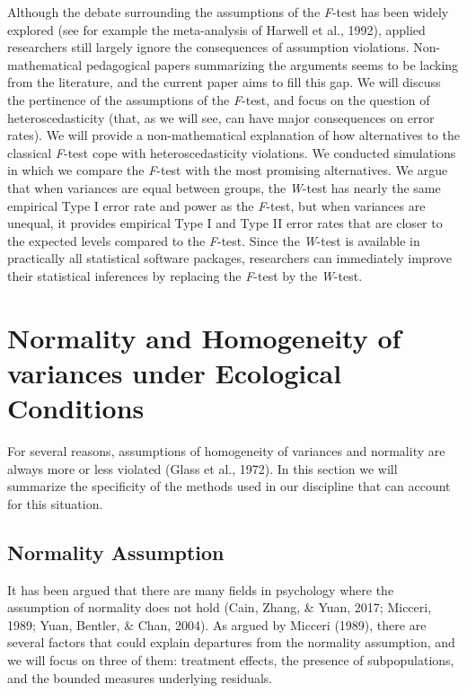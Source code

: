 \documentclass[man,floatsintext]{apa6}
\begin{document}
Although the debate surrounding the assumptions of the \emph{F}-test has been widely explored (see for example the meta-analysis of Harwell et al., 1992), applied researchers still largely ignore the consequences of assumption violations. Non-mathematical pedagogical papers summarizing the arguments seems to be lacking from the literature, and the current paper aims to fill this gap. We will discuss the pertinence of the assumptions of the \emph{F}-test, and focus on the question of heteroscedasticity (that, as we will see, can have major consequences on error rates). We will provide a non-mathematical explanation of how alternatives to the classical \emph{F}-test cope with heteroscedasticity violations. We conducted simulations in which we compare the \emph{F}-test with the most promising alternatives. We argue that when variances are equal between groups, the \emph{W}-test has nearly the same empirical Type I error rate and power as the \emph{F}-test, but when variances are unequal, it provides empirical Type I and Type II error rates that are closer to the expected levels compared to the \emph{F}-test. Since the \emph{W}-test is available in practically all statistical software packages, researchers can immediately improve their statistical inferences by replacing the \emph{F}-test by the \emph{W}-test.

\hypertarget{normality-and-homogeneity-of-variances-under-ecological-conditions}{%
\section{Normality and Homogeneity of variances under Ecological Conditions}\label{normality-and-homogeneity-of-variances-under-ecological-conditions}}

For several reasons, assumptions of homogeneity of variances and normality are always more or less violated (Glass et al., 1972). In this section we will summarize the specificity of the methods used in our discipline that can account for this situation.

\hypertarget{normality-assumption}{%
\subsection{Normality Assumption}\label{normality-assumption}}

It has been argued that there are many fields in psychology where the assumption of normality does not hold (Cain, Zhang, \& Yuan, 2017; Micceri, 1989; Yuan, Bentler, \& Chan, 2004). As argued by Micceri (1989), there are several factors that could explain departures from the normality assumption, and we will focus on three of them: treatment effects, the presence of subpopulations, and the bounded measures underlying residuals.
\end{document}
